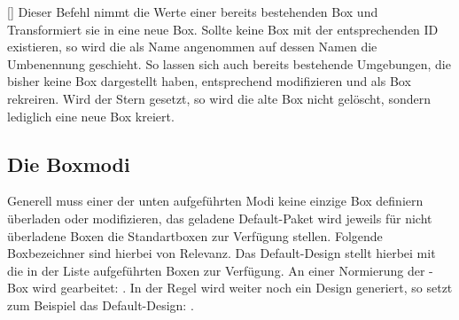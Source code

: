 [\optStar{}\secline{}]
Dieser Befehl nimmt die Werte einer bereits bestehenden Box und Transformiert sie in eine neue Box. Sollte keine Box mit der entsprechenden ID existieren, so wird die  als Name angenommen auf dessen Namen die Umbenennung geschieht. So lassen sich auch bereits bestehende Umgebungen, die bisher keine Box dargestellt haben, entsprechend modifizieren und als Box rekreiren. Wird der Stern gesetzt, so wird die alte Box nicht gelöscht, sondern lediglich eine neue Box kreiert.


\subsection{Die Boxmodi}
Generell muss einer der unten aufgeführten Modi keine einzige Box definiern überladen oder modifizieren, das geladene Default-Paket wird jeweils für nicht überladene Boxen die Standartboxen zur Verfügung stellen. Folgende Boxbezeichner sind hierbei von Relevanz. Das Default-Design stellt hierbei mit  die in der Liste  aufgeführten Boxen zur Verfügung. An einer Normierung der -Box wird gearbeitet: %
\getRegisteredBoxes%
\def\mergel#1{\T{LILLYxBOXx#1}}. In der Regel wird weiter noch ein Design generiert, so setzt zum Beispiel das Default-Design: .

